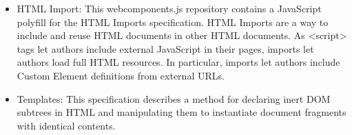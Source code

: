 \begin{itemize}
\item HTML Import: This webcomponents.js repository contains a  JavaScript  polyfill  for the HTML Imports specification. HTML Imports are a way to include and reuse HTML documents in other HTML documents. As <script> tags let authors include external JavaScript in their pages, imports let authors load full HTML resources. In particular, imports let authors include Custom Element definitions from external URLs.
\end{itemize}
\begin{itemize}
\item Templates: This specification describes a method for declaring inert DOM subtrees in HTML and manipulating them to instantiate document fragments with identical contents.
\end{itemize}